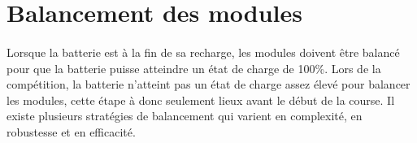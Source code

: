 
\section{Balancement des modules}
	\paragraph*{}
	Lorsque la batterie est à la fin de sa recharge, les modules doivent être balancé pour que la batterie puisse atteindre un état de charge de 100\%. Lors de la compétition, la batterie n'atteint pas un état de charge assez élevé pour balancer les modules, cette étape à donc seulement lieux avant le début de la course. Il existe plusieurs stratégies de balancement qui varient en complexité, en robustesse et en efficacité.